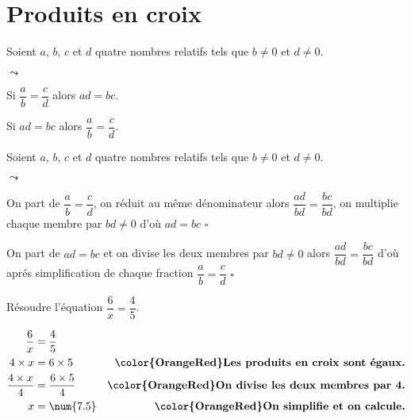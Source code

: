 \section{Produits en croix}
\begin{propriete}
Soient $a$, $b$, $c$ et $d$ quatre nombres relatifs tels que $b\neq 0$ et $d\neq 0$.
    \begin{list}{$\leadsto$}{}
        \item Si $\dfrac{a}{b}=\dfrac{c}{d}$ alors $ad=bc$.
        \item Si $ad=bc$ alors $\dfrac{a}{b}=\dfrac{c}{d}$.
    \end{list}
\end{propriete}


\begin{preuve}
Soient $a$, $b$, $c$ et $d$ quatre nombres relatifs tels que $b\neq 0$ et $d\neq 0$.\\
    \begin{list}{$\leadsto$}{}
        \item On part de $\dfrac{a}{b}=\dfrac{c}{d}$, on réduit au même dénominateur alors $\dfrac{ad}{bd}=\dfrac{bc}{bd}$, on multiplie chaque membre par $bd\neq 0$ 
        d'où $ad=bc$ $\square$
        \item On part de $ad=bc$ et on divise les deux membres par $bd\neq 0$ alors $\dfrac{ad}{bd}=\dfrac{bc}{bd}$ d'où aprés simplification de chaque fraction $\dfrac{a}{b}=\dfrac{c}{d}$ $\square$
    \end{list}
\end{preuve}

\begin{exemple}
    Résoudre l'équation $\dfrac{6}{x}=\dfrac{4}{5}$.\par\vspace*{10mm}
    \correction    
    \begin{align*}
    \dfrac{6}{x}        &=\dfrac{4}{5}           &\\
    4\times x           &= 6\times 5             &\text{\bfseries \color{OrangeRed}Les produits en croix sont égaux.}\\
    \dfrac{4\times x}{4}&= \dfrac{6\times 5}{4}  &\text{\bfseries \color{OrangeRed}On divise les deux membres par 4.}\\
    x                   &=\num{7.5}              &\text{\bfseries \color{OrangeRed}On simplifie et on calcule.}
    \end{align*}
\end{exemple}

